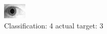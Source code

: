 \begin{figure}[h!]
\begin{center}
\includegraphics[width=0.60\columnwidth]{figures/ID1926_class_4_target_3.png}
\end{center}
\caption{ Classification: 4 actual target: 3}
\label{fig:ID1926_class_4_target_3}
\end{figure}
